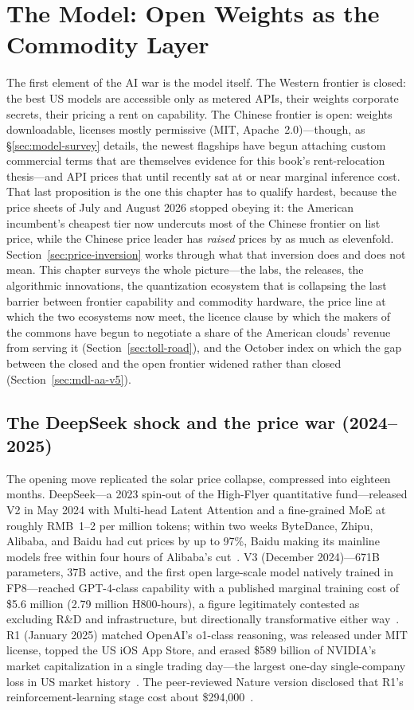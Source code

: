 \chapter{The Model: Open Weights as the Commodity Layer}
\label{ch:model}

The first element of the AI war is the model itself. The Western frontier is closed: the best US models are accessible only as metered APIs, their weights corporate secrets, their pricing a rent on capability. The Chinese frontier is open: weights downloadable, licenses mostly permissive (MIT, Apache~2.0)---though, as \S\ref{sec:model-survey} details, the newest flagships have begun attaching custom commercial terms that are themselves evidence for this book's rent-relocation thesis---and API prices that until recently sat at or near marginal inference cost. That last proposition is the one this chapter has to qualify hardest, because the price sheets of July and August 2026 stopped obeying it: the American incumbent's cheapest tier now undercuts most of the Chinese frontier on list price, while the Chinese price leader has \emph{raised} prices by as much as elevenfold. Section~\ref{sec:price-inversion} works through what that inversion does and does not mean. This chapter surveys the whole picture---the labs, the releases, the algorithmic innovations, the quantization ecosystem that is collapsing the last barrier between frontier capability and commodity hardware, the price line at which the two ecosystems now meet, the licence clause by which the makers of the commons have begun to negotiate a share of the American clouds' revenue from serving it (Section~\ref{sec:toll-road}), and the October index on which the gap between the closed and the open frontier widened rather than closed (Section~\ref{sec:mdl-aa-v5}).

\section{The DeepSeek shock and the price war (2024--2025)}

The opening move replicated the solar price collapse, compressed into eighteen months. DeepSeek---a 2023 spin-out of the High-Flyer quantitative fund---released V2 in May 2024 with Multi-head Latent Attention and a fine-grained MoE at roughly RMB~1--2 per million tokens; within two weeks ByteDance, Zhipu, Alibaba, and Baidu had cut prices by up to 97\%, Baidu making its mainline models free within four hours of Alibaba's cut~\cite{price-war}. V3 (December 2024)---671B parameters, 37B active, and the first open large-scale model natively trained in FP8---reached GPT-4-class capability with a published marginal training cost of \$5.6 million (2.79 million H800-hours), a figure legitimately contested as excluding R\&D and infrastructure, but directionally transformative either way~\cite{deepseek-v3}. R1 (January 2025) matched OpenAI's o1-class reasoning, was released under MIT license, topped the US iOS App Store, and erased \$589 billion of NVIDIA's market capitalization in a single trading day---the largest one-day single-company loss in US market history~\cite{r1-shock}. The peer-reviewed Nature version disclosed that R1's reinforcement-learning stage cost about \$294,000~\cite{r1-nature}.

